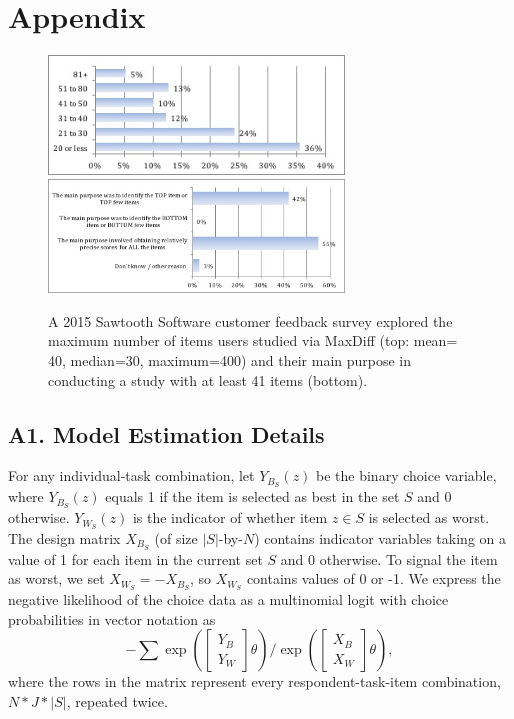 \documentclass[nonblindrev]{informs3}
\begin{document}

\newpage

\section*{Appendix} 


\begin{figure}
\caption{A 2015 Sawtooth Software customer feedback survey explored the maximum number of items users studied via MaxDiff (top: mean= 40, median=30, maximum=400) and their main purpose in conducting a study with at least 41 items (bottom). } 
\label{fig:max_and_purpose}
\begin{center} 
\includegraphics[width=0.7\textwidth]{plots/maxnumstudy}
\includegraphics[width=0.7\textwidth]{plots/maxdiffpurpose}
\end{center}
\end{figure}


\subsection*{A1. Model Estimation Details}
For any individual-task combination, let $Y_{B_S}(z)$ be the binary choice variable, where $Y_{B_S}(z)$ equals 1 if the item is selected as best in the set $S$ and 0 otherwise. $Y_{W_S}(z)$ is the indicator of whether item $z \in S$ is selected as worst. The design matrix $X_{B_S}$ (of size $|S|$-by-$N$) contains indicator variables taking on a value of 1 for each item in the current set $S$ and 0 otherwise. To signal the item as worst, we set $X_{W_S}=-X_{B_S}$, so $X_{W_S}$ contains values of 0 or -1. We express the negative likelihood of the choice data as a multinomial logit with choice probabilities in vector notation as
\[
-\sum
\exp{(\begin{bmatrix}Y_B\\Y_W\end{bmatrix}\theta)} / \exp{(\begin{bmatrix}X_B\\X_W\end{bmatrix}\theta)},
\]
where the rows in the matrix represent every respondent-task-item combination, $N*J*|S|$, repeated twice.  
\end{document}
